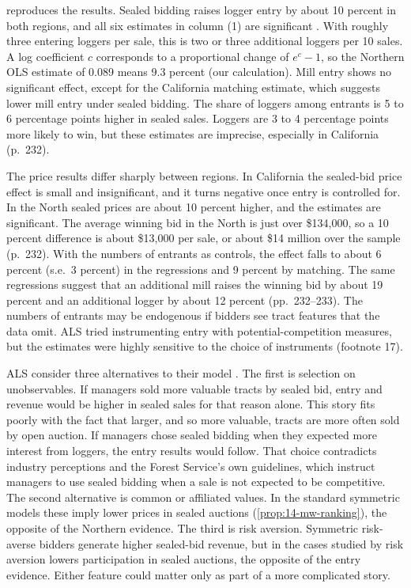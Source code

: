  reproduces the results. Sealed bidding raises logger entry by about 10 percent
in both regions, and all six estimates in column (1) are significant \citep[p.~230]{AtheyLevinSeira2011}.
With roughly three entering loggers per sale, this is two or three additional loggers per 10 sales. A
log coefficient $c$ corresponds to a proportional change of $e^{c}-1$, so the Northern OLS estimate of
0.089 means 9.3 percent (our calculation). Mill entry shows no significant effect, except for the
California matching estimate, which suggests lower mill entry under sealed bidding. The share of loggers
among entrants is 5 to 6 percentage points higher in sealed sales. Loggers are 3 to 4 percentage points
more likely to win, but these estimates are imprecise, especially in California (p.~232).

The price results differ sharply between regions. In California the sealed-bid price effect is small and
insignificant, and it turns negative once entry is controlled for. In the North sealed prices are about
10 percent higher, and the estimates are significant. The average winning bid in the North is just over
\$134,000, so a 10 percent difference is about \$13,000 per sale, or about \$14 million over the sample
(p.~232). With the numbers of entrants as controls, the effect falls to about 6 percent (s.e.\ 3 percent)
in the regressions and 9 percent by matching. The same regressions suggest that an additional mill raises
the winning bid by about 19 percent and an additional logger by about 12 percent (pp.~232--233). The
numbers of entrants may be endogenous if bidders see tract features that the data omit. ALS tried
instrumenting entry with potential-competition measures, but the estimates were highly sensitive to the
choice of instruments (footnote 17).

ALS consider three alternatives to their model \citep[pp.~233--234]{AtheyLevinSeira2011}. The first is
selection on unobservables. If managers sold more valuable tracts by sealed bid, entry and revenue would
be higher in sealed sales for that reason alone. This story fits poorly with the fact that larger, and so
more valuable, tracts are more often sold by open auction. If managers chose sealed bidding when they
expected more interest from loggers, the entry results would follow. That choice contradicts industry
perceptions and the Forest Service's own guidelines, which instruct managers to use sealed bidding when a
sale is not expected to be competitive. The second alternative is common or affiliated values. In the
standard symmetric models these imply lower prices in sealed auctions (\cref{prop:14-mw-ranking}), the
opposite of the Northern evidence. The third is risk aversion. Symmetric risk-averse bidders generate
higher sealed-bid revenue, but in the cases studied by \citet{Matthews1987} risk aversion lowers
participation in sealed auctions, the opposite of the entry evidence. Either feature could matter only as
part of a more complicated story.

